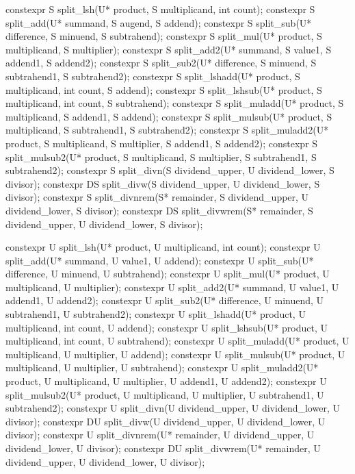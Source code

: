 \begin{addedblock}
\begin{itemdecl}
constexpr S split_lsh(U* product, S multiplicand, int count);
constexpr S split_add(U* summand, S augend, S addend);
constexpr S split_sub(U* difference, S minuend, S subtrahend);
constexpr S split_mul(U* product, S multiplicand, S multiplier);
constexpr S split_add2(U* summand, S value1, S addend1, S addend2);
constexpr S split_sub2(U* difference, S minuend, S subtrahend1, S subtrahend2);
constexpr S split_lshadd(U* product, S multiplicand, int count, S addend);
constexpr S split_lshsub(U* product, S multiplicand, int count, S subtrahend);
constexpr S split_muladd(U* product, S multiplicand, S addend1, S addend);
constexpr S split_mulsub(U* product, S multiplicand, S subtrahend1, S subtrahend2);
constexpr S split_muladd2(U* product, S multiplicand, S multiplier, S addend1, S addend2);
constexpr S split_mulsub2(U* product, S multiplicand, S multiplier, S subtrahend1, S subtrahend2);
constexpr S split_divn(S dividend_upper, U dividend_lower, S divisor);
constexpr DS split_divw(S dividend_upper, U dividend_lower, S divisor);
constexpr S split_divnrem(S* remainder, S dividend_upper, U dividend_lower, S divisor);
constexpr DS split_divwrem(S* remainder, S dividend_upper, U dividend_lower, S divisor);

constexpr U split_lsh(U* product, U multiplicand, int count);
constexpr U split_add(U* summand, U value1, U addend);
constexpr U split_sub(U* difference, U minuend, U subtrahend);
constexpr U split_mul(U* product, U multiplicand, U multiplier);
constexpr U split_add2(U* summand, U value1, U addend1, U addend2);
constexpr U split_sub2(U* difference, U minuend, U subtrahend1, U subtrahend2);
constexpr U split_lshadd(U* product, U multiplicand, int count, U addend);
constexpr U split_lshsub(U* product, U multiplicand, int count, U subtrahend);
constexpr U split_muladd(U* product, U multiplicand, U multiplier, U addend);
constexpr U split_mulsub(U* product, U multiplicand, U multiplier, U subtrahend);
constexpr U split_muladd2(U* product, U multiplicand, U multiplier, U addend1, U addend2);
constexpr U split_mulsub2(U* product, U multiplicand, U multiplier, U subtrahend1, U subtrahend2);
constexpr U split_divn(U dividend_upper, U dividend_lower, U divisor);
constexpr DU split_divw(U dividend_upper, U dividend_lower, U divisor);
constexpr U split_divnrem(U* remainder, U dividend_upper, U dividend_lower, U divisor);
constexpr DU split_divwrem(U* remainder, U dividend_upper, U dividend_lower, U divisor);
\end{itemdecl}


\end{addedblock}
